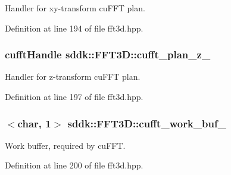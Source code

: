Handler for xy-\/transform cu\+F\+F\+T plan. 



Definition at line 194 of file fft3d.\+hpp.

\hypertarget{classsddk_1_1_f_f_t3_d_a62151c9726c5dc0ea56f3da721506ac5}{}
\subsubsection[{cufft\+\_\+plan\+\_\+z\+\_\+}]{\setlength{\rightskip}{0pt plus 5cm}cufft\+Handle sddk\+::\+F\+F\+T3\+D\+::cufft\+\_\+plan\+\_\+z\+\_\+\hspace{0.3cm}{\ttfamily [protected]}}\label{classsddk_1_1_f_f_t3_d_a62151c9726c5dc0ea56f3da721506ac5}


Handler for z-\/transform cu\+F\+F\+T plan. 



Definition at line 197 of file fft3d.\+hpp.

\hypertarget{classsddk_1_1_f_f_t3_d_ab808ebb702ad2ccb83c1c90afa7e9a1e}{}
\subsubsection[{cufft\+\_\+work\+\_\+buf\+\_\+}]{$<$char, 1$>$ sddk\+::\+F\+F\+T3\+D\+::cufft\+\_\+work\+\_\+buf\+\_\+\hspace{0.3cm}{\ttfamily [protected]}}\label{classsddk_1_1_f_f_t3_d_ab808ebb702ad2ccb83c1c90afa7e9a1e}


Work buffer, required by cu\+F\+F\+T. 



Definition at line 200 of file fft3d.\+hpp.

\hypertarget{classsddk_1_1_f_f_t3_d_aa9363e6990496fc3cae2c15c3d930172}{}
